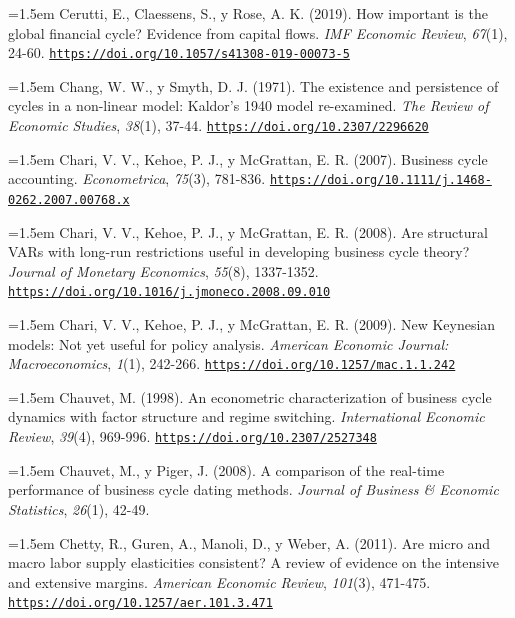 \documentclass[10pt,a4paper]{article}
\begin{document}
\noindent\hangindent=1.5em Cerutti, E., Claessens, S., y Rose, A. K. (2019). How important is the global financial cycle? Evidence from capital flows. \textit{IMF Economic Review}, \textit{67}(1), 24-60. \href{https://doi.org/10.1057/s41308-019-00073-5}{\nolinkurl{https://doi.org/10.1057/s41308-019-00073-5}}

{\sloppy\noindent\hangindent=1.5em Chang, W. W., y Smyth, D. J. (1971). The existence and persistence of cycles in a non-linear model: Kaldor's 1940 model re-examined. \textit{The Review of Economic Studies}, \textit{38}(1), 37-44. \href{https://doi.org/10.2307/2296620}{\nolinkurl{https://doi.org/10.2307/2296620}}\par}

\noindent\hangindent=1.5em Chari, V. V., Kehoe, P. J., y McGrattan, E. R. (2007). Business cycle accounting. \textit{Econometrica}, \textit{75}(3), 781-836. \href{https://doi.org/10.1111/j.1468-0262.2007.00768.x}{\nolinkurl{https://doi.org/10.1111/j.1468-0262.2007.00768.x}}

\noindent\hangindent=1.5em Chari, V. V., Kehoe, P. J., y McGrattan, E. R. (2008). Are structural VARs with long-run restrictions useful in developing business cycle theory? \textit{Journal of Monetary Economics}, \textit{55}(8), 1337-1352. \href{https://doi.org/10.1016/j.jmoneco.2008.09.010}{\nolinkurl{https://doi.org/10.1016/j.jmoneco.2008.09.010}}

\noindent\hangindent=1.5em Chari, V. V., Kehoe, P. J., y McGrattan, E. R. (2009). New Keynesian models: Not yet useful for policy analysis. \textit{American Economic Journal: Macroeconomics}, \textit{1}(1), 242-266. \href{https://doi.org/10.1257/mac.1.1.242}{\nolinkurl{https://doi.org/10.1257/mac.1.1.242}}

\noindent\hangindent=1.5em Chauvet, M. (1998). An econometric characterization of business cycle dynamics with factor structure and regime switching. \textit{International Economic Review}, \textit{39}(4), 969-996. \href{https://doi.org/10.2307/2527348}{\nolinkurl{https://doi.org/10.2307/2527348}}

\noindent\hangindent=1.5em Chauvet, M., y Piger, J. (2008). A comparison of the real-time performance of business cycle dating methods. \textit{Journal of Business \& Economic Statistics}, \textit{26}(1), 42-49.

\noindent\hangindent=1.5em Chetty, R., Guren, A., Manoli, D., y Weber, A. (2011). Are micro and macro labor supply elasticities consistent? A review of evidence on the intensive and extensive margins. \textit{American Economic Review}, \textit{101}(3), 471-475. \href{https://doi.org/10.1257/aer.101.3.471}{\nolinkurl{https://doi.org/10.1257/aer.101.3.471}}
\end{document}
